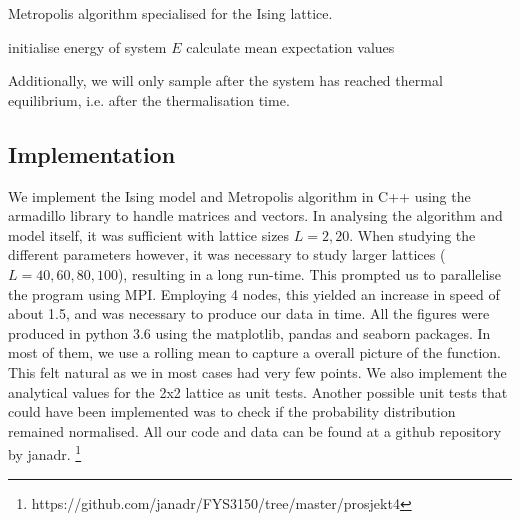 	\begin{algorithm}[htbp]
	\label{algo:metro}
	\caption{Metropolis algorithm specialised for the Ising lattice.}
		\SetAlgoLined
		\BlankLine
		\BlankLine
		initialise energy of system $E$\;
		calculate mean expectation values\;	
		\BlankLine
		\BlankLine
	\end{algorithm}

Additionally, we will only sample after the system has reached thermal equilibrium, i.e. after the thermalisation time.

\subsection{Implementation}
\label{sec:implementation}

We implement the Ising model and Metropolis algorithm in C++ using the armadillo library to handle matrices and vectors. In analysing the algorithm and model itself, it was sufficient with lattice sizes $L=2, 20$. When studying the different parameters however, it was necessary to study larger lattices ($L = 40, 60, 80, 100$), resulting in a long run-time. This prompted us to parallelise the program using MPI. Employing 4 nodes, this yielded an increase in speed of about 1.5, and was necessary to produce our data in time.
All the figures were produced in python 3.6 using the matplotlib, pandas and seaborn packages. In most of them, we use a rolling mean to capture a overall picture of the function. This felt natural as we in most cases had very few points. We also implement the analytical values for the 2x2 lattice as unit tests. Another possible unit tests that could have been implemented was to check if the probability distribution remained normalised. All our code and data can be found at a github repository by janadr. \footnote{https://github.com/janadr/FYS3150/tree/master/prosjekt4}
